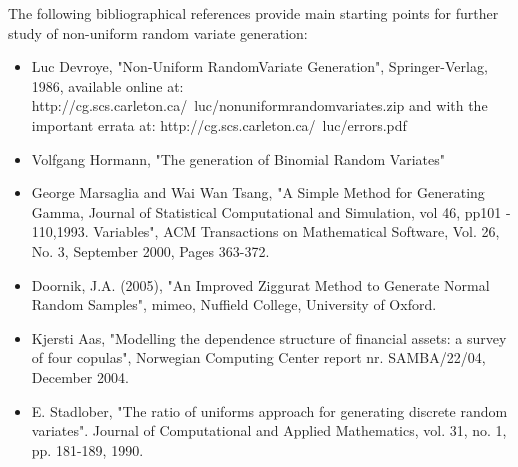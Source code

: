 {
  The following bibliographical references provide main starting points for further study of non-uniform random variate generation:
  \begin{itemize}
  \item Luc Devroye, "Non-Uniform RandomVariate Generation", Springer-Verlag, 1986, available online at:
    http://cg.scs.carleton.ca/~luc/nonuniformrandomvariates.zip
    and with the important errata at:
    http://cg.scs.carleton.ca/~luc/errors.pdf
  \item Volfgang Hormann, "The generation of Binomial Random Variates"
  \item George Marsaglia and Wai Wan Tsang, "A Simple Method for Generating Gamma, Journal of Statistical Computational and Simulation, vol 46, pp101 - 110,1993.
    Variables", ACM Transactions on Mathematical Software, Vol. 26, No. 3,
    September 2000, Pages 363-372.
  \item Doornik, J.A. (2005), "An Improved Ziggurat Method to Generate Normal
    Random Samples", mimeo, Nuffield College, University of Oxford.
  \item Kjersti Aas, "Modelling the dependence structure of financial assets: a survey of four copulas",
    Norwegian Computing Center report nr. SAMBA/22/04, December 2004.
  \item E. Stadlober, "The ratio of uniforms approach for generating discrete random variates". Journal of Computational and Applied Mathematics, vol. 31, no. 1, pp. 181-189, 1990.
  \end{itemize}
}
\Example{

  --

}
